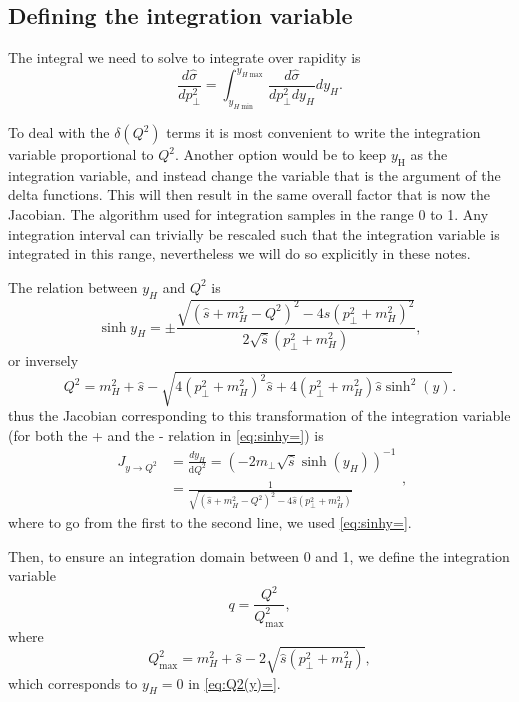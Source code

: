 \documentclass[10pt]{report}
\newcommand{\dd}{\mathrm{d}}
\begin{document}
\subsection{Defining the integration variable}
The integral we need to solve to integrate over rapidity is 
\begin{equation}
\frac{d \hat{\sigma}}{d p_{\perp}^{2}}=\int_{y_{H \min }}^{y_{H \max }} \frac{d  \hat{\sigma}}{d p_{\perp}^{2} d y_H} d y_H.
\end{equation}


To deal with the $\delta(Q^2)$ terms it is most convenient to write the integration variable proportional to $Q^2$. Another option would be to keep $y_\mathrm{H}$ as the integration variable, and instead change the variable that is the argument of the delta functions. This will then result in the same overall factor that is now the Jacobian. The algorithm used for integration samples in the range 0 to 1. Any integration interval can trivially be rescaled such that the integration variable is integrated in this range, nevertheless we will do so explicitly in these notes. 

The relation between $y_H$ and $Q^2$ is
\begin{equation}
\sinh y_H=\pm \frac{\sqrt{\left(\hat{s}+m_H^{2}-Q^{2}\right)^{2}-4 s \left(p_{\perp}^{2}+m_H^{2}\right)^{2}}}{2 \sqrt{\hat{s}} \left(p_{\perp}^{2}+m_H^{2}\right)},
\label{eq:sinhy=}
\end{equation}
or inversely 
\begin{equation}
Q^2 = m_H^2+\hat{s}-\sqrt{4 \left(p_{\perp}^{2}+m_H^{2}\right)^2 \hat{s} + 4 \left(p_{\perp}^{2}+m_H^{2}\right) {\hat{s}} \sinh^2(y) }.
\label{eq:Q2(y)=}
\end{equation}
thus the Jacobian corresponding to this transformation of the integration variable (for both the + and the - relation in \eqref{eq:sinhy=}) is 
\begin{equation}
\begin{aligned}
J_{y \rightarrow Q^{2}} &=\frac{d y_H}{\dd Q^{2}}=\left(-2m_{\perp} \sqrt{\hat{s}}\sinh(y_H)\right)^{-1} \\
&=\frac{1}{\sqrt{\left(\hat{s}+m_H^{2}-Q^{2}\right)^{2}-4 \hat{s}\left(p_{\perp}^{2}+m_H^{2}\right)}}
\end{aligned},
\end{equation}
where to go from the first to the second line, we used \eqref{eq:sinhy=}.

Then, to ensure an integration domain between 0 and 1, we define the integration variable
\begin{equation}
q = \frac{Q^2}{Q^2_{\max}},
\label{eq:q=Q2/Q2max}
\end{equation}
where 
\begin{equation}
Q_{\max }^{2}=m_H^2+\hat{s}-2 \sqrt{\hat{s}\left(p_{\perp}^{2}+m_H^{2}\right)},
\end{equation}
which corresponds to $y_H=0$ in \eqref{eq:Q2(y)=}.
\end{document}
